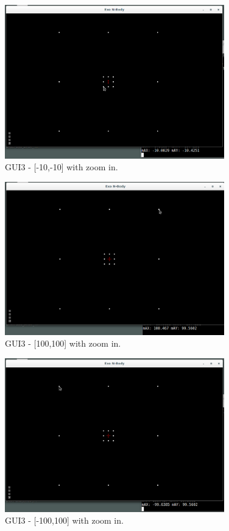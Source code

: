 \pagebreak

\begin{figure}[H]
  \centering
  \includegraphics[width=0.85\textwidth]{img/testingEvidence/gui3_0.png}
  \caption{GUI3 - [-10,-10] with zoom in.}
\end{figure}

\begin{figure}[H]
  \centering
  \includegraphics[width=0.85\textwidth]{img/testingEvidence/gui3_1.png}
  \caption{GUI3 - [100,100] with zoom in.}
\end{figure}

\begin{figure}[H]
  \centering
  \includegraphics[width=0.85\textwidth]{img/testingEvidence/gui3_2.png}
  \caption{GUI3 - [-100,100] with zoom in.}
\end{figure}

